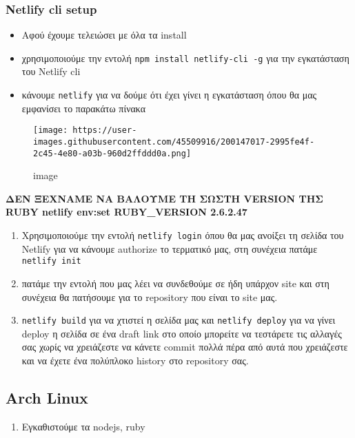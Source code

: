 \hypertarget{netlify-cli-setup}{%
\subsubsection{Netlify cli setup}\label{netlify-cli-setup}}

\begin{itemize}
\tightlist
\item
  Αφού έχουμε τελειώσει με όλα τα install
\item
  χρησιμοποιούμε την εντολή \texttt{npm\ install\ netlify-cli\ -g} για
  την εγκατάσταση του Netlify cli
\item
  κάνουμε \texttt{netlify} για να δούμε ότι έχει γίνει η εγκατάσταση
  όπου θα μας εμφανίσει το παρακάτω πίνακα
\end{itemize}

\begin{figure}
\centering
\texttt{[image: https://user-images.githubusercontent.com/45509916/200147017-2995fe4f-2c45-4e80-a03b-960d2ffddd0a.png]}
\caption{image}
\end{figure}

\textbf{ΔΕΝ ΞΕΧΝΑΜΕ ΝΑ ΒΑΛΟΥΜΕ ΤΗ ΣΩΣΤΗ VERSION ΤΗΣ RUBY netlify env:set
RUBY\_VERSION 2.6.2.47}

\begin{enumerate}
\def\labelenumi{\arabic{enumi}.}
\tightlist
\item
  Χρησιμοποιούμε την εντολή \texttt{netlify\ login} όπου θα μας ανοίξει
  τη σελίδα του Netlify για να κάνουμε authorize το τερματικό μας, στη
  συνέχεια πατάμε \texttt{netlify\ init}
\item
  πατάμε την εντολή που μας λέει να συνδεθούμε σε ήδη υπάρχον site και
  στη συνέχεια θα πατήσουμε για το repository που είναι το site μας.
\item
  \texttt{netlify\ build} για να χτιστεί η σελίδα μας και
  \texttt{netlify\ deploy} για να γίνει deploy η σελίδα σε ένα draft
  link στο οποίο μπορείτε να τεστάρετε τις αλλαγές σας χωρίς να
  χρειάζεστε να κάνετε commit πολλά πέρα από αυτά που χρειάζεστε και να
  έχετε ένα πολύπλοκο history στο repository σας.
\end{enumerate}

\hypertarget{arch-linux}{%
\subsection{Arch Linux}\label{arch-linux}}

\begin{enumerate}
\def\labelenumi{\arabic{enumi}.}
\tightlist
\item
  Εγκαθιστούμε τα nodejs, ruby
\end{enumerate}

